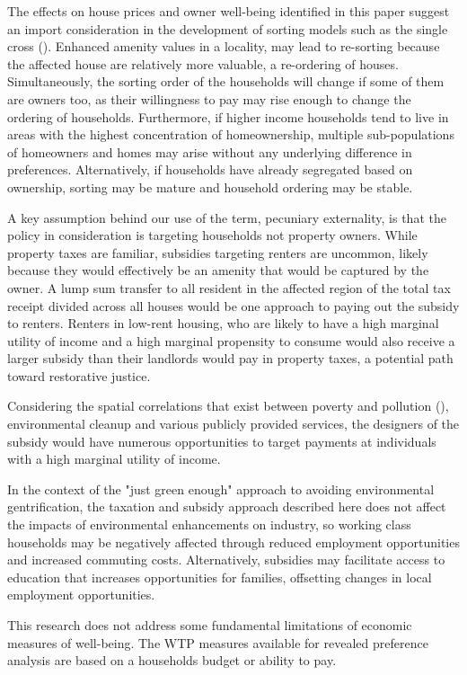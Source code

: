 \documentclass[ecta,nameyear,draft]{econsocart}
\theoremstyle{plain}
\theoremstyle{remark}
\begin{document}
The effects on house prices and owner well-being identified in this paper suggest an import consideration in the development of sorting models such as the single cross (\cite{banzhaf20}). Enhanced amenity values in a locality, may lead to re-sorting because the affected house are relatively more valuable, a re-ordering of houses. Simultaneously, the sorting order of the households will change if some of them are owners too, as their willingness to pay may rise enough to change the ordering of households. Furthermore, if higher income households tend to live in areas with the highest concentration of homeownership, multiple sub-populations of homeowners and homes may arise without any underlying difference in preferences. Alternatively, if households have already segregated based on ownership, sorting may be mature and household ordering may be stable.

A key assumption behind our use of the term, pecuniary externality, is that the policy in consideration is targeting households not property owners. While property taxes are familiar, subsidies targeting renters are uncommon, likely because they would effectively be an amenity that would be captured by the owner. A lump sum transfer to all resident in the affected region of the total tax receipt divided across all houses would be one approach to paying out the subsidy to renters. Renters in low-rent housing, who are likely to have a high marginal utility of income and a high marginal propensity to consume would also receive a larger subsidy than their landlords would pay in property taxes, a potential path toward restorative justice. 

Considering the spatial correlations that exist between poverty and pollution (\cite{banzhafJustice19}), environmental cleanup and various publicly provided services, the designers of the subsidy would have numerous opportunities to target payments at individuals with a high marginal utility of income. 

In the context of the "just green enough" \cite{curran12} approach to avoiding environmental gentrification, the taxation and subsidy approach described here does not affect the impacts of environmental enhancements on industry, so working class households may be negatively affected through reduced employment opportunities and increased commuting costs. Alternatively, subsidies may facilitate access to education that increases opportunities for families, offsetting changes in local employment opportunities.

This research does not address some fundamental limitations of economic measures of well-being. The WTP measures available for revealed preference analysis are based on a households budget or ability to pay. 
\end{document}
